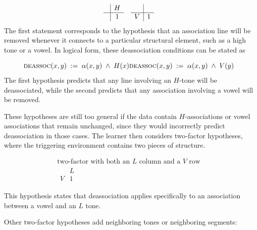 \documentclass{article}[12pt]
\begin{document}
\[
\begin{array}{c}
\begin{array}{c|c}
 & H \\
\hline
 & 1
\end{array}
\end{array}
\begin{array}{c}
\begin{array}{c|c}
 &  \\
\hline
V & 1
\end{array}
\end{array}
\]
The first statement corresponds to the hypothesis that an association
line will be removed whenever it connects to a particular structural
element, such as a high tone or a vowel. In logical form, these
deassociation conditions can be stated as

\[
\textsc{deassoc}(x,y) \;:=\; \alpha(x,y) \;\wedge\; H(x)
\\
\textsc{deassoc}(x,y) \;:=\; \alpha(x,y) \;\wedge\; V(y)
\]
The first hypothesis predicts
that any line involving an \(H\)-tone will be deassociated, while the
second predicts that any association involving a vowel will be removed.

These hypotheses are still too general if the data contain
\(H\)-associations or vowel associations that remain unchanged, since
they would incorrectly predict deassociation in those cases.
The learner then considers two-factor hypotheses, where the triggering
environment contains two pieces of structure.

\[
\begin{array}{c}
\text{two-factor with both an } L \text{ column and a } V \text{ row}
\\[1ex]
\begin{array}{c|c}
 & L \\
\hline
V & 1
\end{array}
\end{array}
\]

This hypothesis states that deassociation applies specifically to an
association between a vowel and an \(L\) tone.

Other two-factor hypotheses add neighboring tones or neighboring
segments:
\end{document}

